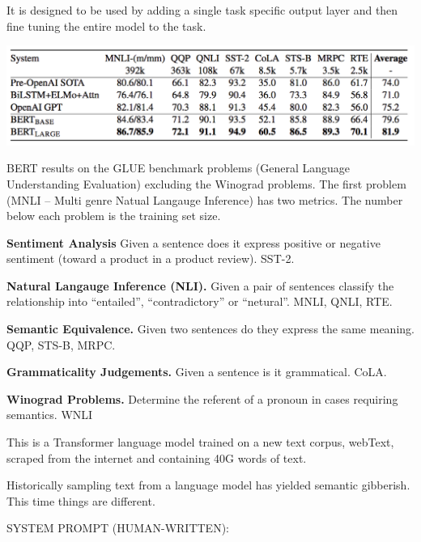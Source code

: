{\vfill It is designed to be used by adding a single task specific output layer and then fine tuning the entire model to the task.


\centerline{\includegraphics[width = 9in]{../images/BERTa}}

BERT results on the GLUE benchmark problems (General Language Understanding Evaluation) excluding the Winograd problems.
The first problem (MNLI -- Multi genre Natual Langauge Inference) has two metrics.  The number below each problem is the training set size.


{\bf Sentiment Analysis} Given a sentence does it express positive or negative sentiment (toward a product in a product review). {\color{red} SST-2}.

\vfill
{\bf Natural Langauge Inference (NLI).}
Given a pair of sentences classify the relationship into ``entailed'', ``contradictory'' or ``netural''. {\color{red} MNLI, QNLI, RTE}.

\vfill
{\bf Semantic Equivalence.} Given two sentences do they express the same meaning. {\color{red} QQP, STS-B, MRPC}.

\vfill
{\bf Grammaticality Judgements.} Given a sentence is it grammatical. {\color{red} CoLA}.

\vfill
{\bf Winograd Problems.} Determine the referent of a pronoun in cases requiring semantics. {\color{red} WNLI}


This is a Transformer language model trained on a new text corpus, webText, scraped from the internet and containing 40G words of text.

\vfill
Historically sampling text from a language model has yielded semantic gibberish.  This time things are different.

\vfill
{}

SYSTEM PROMPT (HUMAN-WRITTEN):

}
